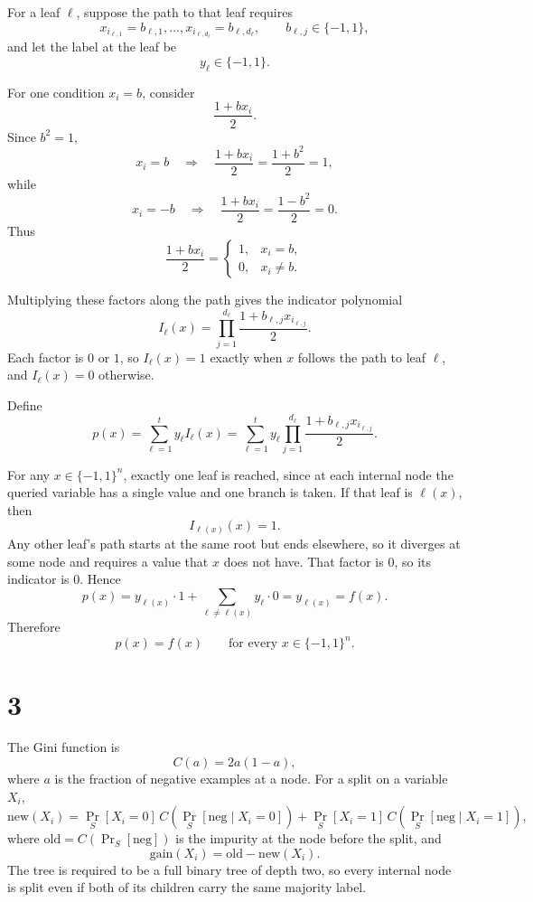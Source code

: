 \documentclass[11pt]{article}
\begin{document}
For a leaf \(\ell\), suppose the path to that leaf requires
\[
x_{i_{\ell,1}}=b_{\ell,1},\ldots,
x_{i_{\ell,d_\ell}}=b_{\ell,d_\ell},
\qquad
b_{\ell,j}\in\{-1,1\},
\]
and let the label at the leaf be
\[
y_\ell\in\{-1,1\}.
\]

For one condition \(x_i=b\), consider
\[
\frac{1+bx_i}{2}.
\]
Since \(b^2=1\),
\[
x_i=b
\quad\Longrightarrow\quad
\frac{1+bx_i}{2}
=
\frac{1+b^2}{2}
=
1,
\]
while
\[
x_i=-b
\quad\Longrightarrow\quad
\frac{1+bx_i}{2}
=
\frac{1-b^2}{2}
=
0.
\]
Thus
\[
\frac{1+bx_i}{2}
=
\begin{cases}
1, & x_i=b,\\
0, & x_i\neq b.
\end{cases}
\]

Multiplying these factors along the path gives the indicator polynomial
\[
I_\ell(x)
=
\prod_{j=1}^{d_\ell}
\frac{1+b_{\ell,j}x_{i_{\ell,j}}}{2}.
\]
Each factor is \(0\) or \(1\), so \(I_\ell(x)=1\) exactly when \(x\)
follows the path to leaf \(\ell\), and \(I_\ell(x)=0\) otherwise.

Define
\[
\boxed{
p(x)
=
\sum_{\ell=1}^{t}y_\ell I_\ell(x)
=
\sum_{\ell=1}^{t}
y_\ell
\prod_{j=1}^{d_\ell}
\frac{1+b_{\ell,j}x_{i_{\ell,j}}}{2}.
}
\]

For any \(x\in\{-1,1\}^n\), exactly one leaf is reached, since at each
internal node the queried variable has a single value and one branch is
taken. If that leaf is \(\ell(x)\), then
\[
I_{\ell(x)}(x)=1.
\]
Any other leaf's path starts at the same root but ends elsewhere, so it
diverges at some node and requires a value that \(x\) does not have. That
factor is \(0\), so its indicator is \(0\). Hence
\[
p(x)
=
y_{\ell(x)}\cdot 1
+
\sum_{\ell\neq\ell(x)}y_\ell\cdot 0
=
y_{\ell(x)}
=
f(x).
\]
Therefore
\[
\boxed{
p(x)=f(x)
\qquad
\text{for every }x\in\{-1,1\}^n.
}
\]

\section*{3}

The Gini function is
\[
C(a)=2a(1-a),
\]
where \(a\) is the fraction of negative examples at a node. For a split on
a variable \(X_i\),
\[
\mathrm{new}(X_i)
=
\Pr_S[X_i=0]\,
C\!\left(\Pr_S[\mathrm{neg}\mid X_i=0]\right)
+
\Pr_S[X_i=1]\,
C\!\left(\Pr_S[\mathrm{neg}\mid X_i=1]\right),
\]
where \(\mathrm{old}=C(\Pr_S[\mathrm{neg}])\) is the impurity at the node
before the split, and
\[
\mathrm{gain}(X_i)
=
\mathrm{old}-\mathrm{new}(X_i).
\]
The tree is required to be a full binary tree of depth two, so every internal
node is split even if both of its children carry the same majority label.
\end{document}
